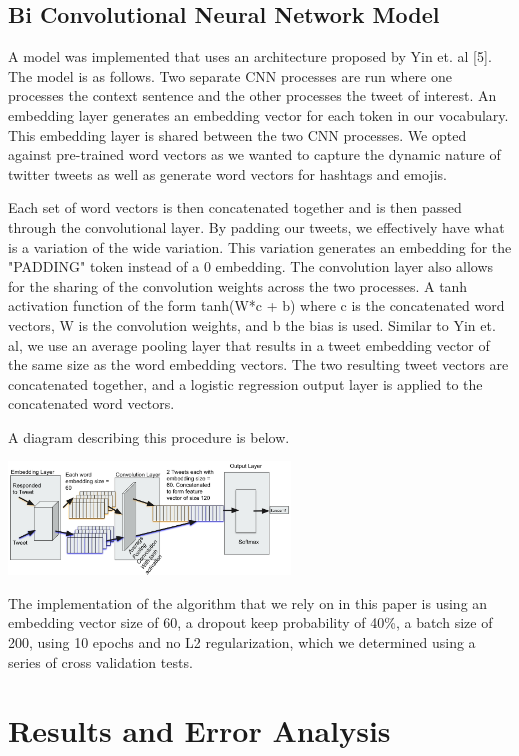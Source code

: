 \documentclass[11pt,a4paper]{article}
\begin{document}
\subsection{Bi Convolutional Neural Network Model}

A model was implemented that uses an architecture proposed by Yin et. al [5]. The model is as follows. Two separate CNN processes are run where one processes the context sentence and the other processes the tweet of interest. An embedding layer generates an embedding vector for each token in our vocabulary. This embedding layer is shared between the two CNN processes. We opted against pre-trained word vectors as we wanted to capture the dynamic nature of twitter tweets as well as generate word vectors for hashtags and emojis. 

Each set of word vectors is then concatenated together and is then passed through the convolutional layer. By padding our tweets, we effectively have what is a variation of the wide variation. This variation generates an embedding for the "PADDING" token instead of a 0 embedding. The convolution layer also allows for the sharing of the convolution weights across the two processes. A tanh activation function of the form tanh(W*c + b)  where c is the concatenated word vectors, W is the convolution weights, and b the bias is used. Similar to Yin et. al, we use an average pooling layer that results in a tweet embedding vector of the same size as the word embedding vectors. The two resulting tweet vectors are concatenated together, and a logistic regression output layer is applied to the concatenated word vectors.

A diagram describing this procedure is below.

\includegraphics[width=75mm,scale=0.5]{bcnn.png}

The implementation of the algorithm that we rely on in this paper is using an embedding vector size of 60, a dropout keep probability of 40\%, a batch size of 200, using 10 epochs and no L2 regularization, which we determined using a series of cross validation tests.

\section{Results and Error Analysis}
\end{document}
